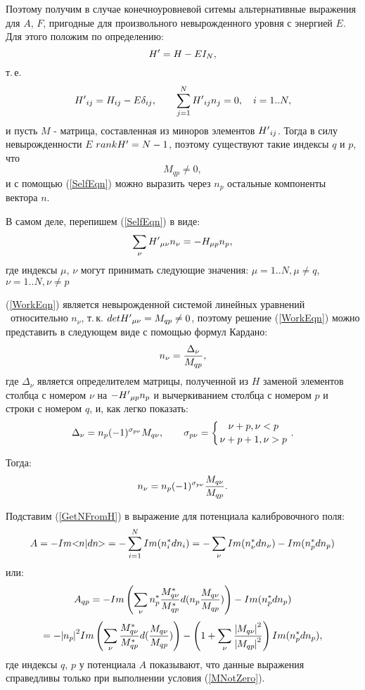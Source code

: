 \documentclass[a4paper,titlepage]{article}
\newcommand{\MathBr}[1]{\ifmmode{#1} \else{$#1$} \fi}
\newcommand{\Ht}{\MathBr{H'}}
\newcommand{\DirProd}[2]{\MathBr{<\!\!#1|#2\!\!>}}
\newcommand{\mod}[1]{\MathBr{\mid\!\!#1\!\!\mid}}
\newcommand{\rf}[1]{(\ref{#1})}
\begin{document}
Поэтому получим в случае конечноуровневой ситемы альтернативные выражения
для $A$, $F$, пригодные для произвольного невырожденного уровня с
энергией $E$. Для этого положим по определению:
\[
   \Ht = H - EI_N,
\]
 т.\,е.
\begin{equation}
  \Ht_{ij} = H_{ij} - E\delta_{ij},
  \qquad \sum_{j = 1}^{N} \Ht_{ij} n_j = 0, \quad i = 1..N,
\label{SelfEqn}
\end{equation}
и пусть $M$ - матрица, составленная из миноров элементов $\Ht_{ij}$.
Тогда в силу невырожденности $E$ $rank \Ht = N - 1$, поэтому
существуют такие индексы $q$ и $p$, что
\begin{equation}
   M_{qp} \ne 0,
\label{MNotZero}
\end{equation}
и с помощью \rf{SelfEqn} можно выразить через $n_p$ остальные компоненты
вектора $n$.

В самом деле, перепишем \rf{SelfEqn} в виде:
\begin{equation}
  \sum_{\nu} \Ht_{\mu\nu} n_\nu = - H_{\mu p} n_p,
\label{WorkEqn}
\end{equation}
где индексы $\mu$, $\nu$ могут принимать следующие значения:
$ \mu = 1..N, \mu \ne q$, $ \nu = 1..N, \nu \ne p$

\rf{WorkEqn} является невырожденной системой линейных уравнений \
относительно $n_\nu$, т.\,к. $det \Ht_{\mu\nu} = M_{qp} \ne 0$,
поэтому решение \rf{WorkEqn} можно представить в следующем виде с помощью
формул Кардано:
\[
   n_\nu = {\Delta_\nu \over M_{qp}},
\]
где $\Delta_\nu$ является определителем матрицы, полученной из $H$
заменой элементов столбца с номером $\nu $ на $-\Ht_{\mu p} n_p$
и вычеркиванием столбца с номером $p$ и строки с номером $q$,
и, как легко показать:
\[
   \Delta_\nu = n_p (-1)^{\sigma_{p\nu}} M_{q\nu}, \qquad
    \sigma_{p\nu} =
     \left\{{\nu + p , \nu < p \atop \nu + p + 1, \nu > p} \right. .
\]

Тогда:
\begin{equation}
  n_\nu = n_p (-1)^{\sigma_{p\nu}} {M_{q\nu} \over M_{qp}}.
\label{GetNFromH}
\end{equation}

Подставим \rf{GetNFromH} в выражение для потенциала
калибровочного поля:
\[
   A = - Im\DirProd{n}{dn} = - \sum_{i=1}^{N} Im(n^\ast_i dn_i) =
     - \sum_{\nu} Im(n^\ast_\nu dn_\nu) - Im(n^\ast_p dn_p)
\]
или:
\[
  A_{qp} = - Im\left(\sum_{\nu} n^\ast_p {M^\ast_{q\nu} \over M^\ast_{qp}}
    d(n_p {M_{q\nu} \over M_{qp}})\right) - Im(n^\ast_p dn_p)
\]
\[
  = - \mod{n_p}^2Im\left(\sum_{\nu} {M^\ast_{q\nu} \over M^\ast_{qp}}
    d({M_{q\nu} \over M_{qp}})\right) -
    \left(1 + \sum_{\nu} {\mod{M_{q\nu}}^2 \over \mod{M_{qp}}^2}\right)
     Im(n^\ast_p dn_p),
\]
  где индексы $q$, $p$ у потенциала $A$ показывают, что данные
выражения справедливы только при выполнении условия \rf{MNotZero}.
\end{document}
